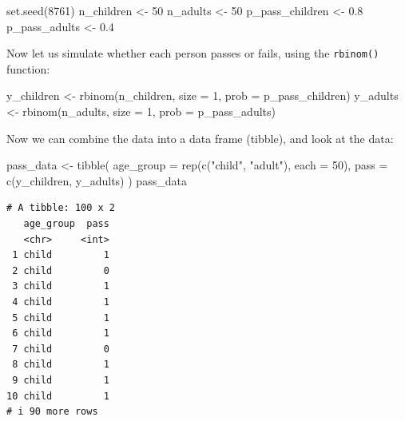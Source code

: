 \documentclass[
  letterpaper,
  8pt,
  a4paper]{book}
\newenvironment{Shaded}{\begin{snugshade}}{\end{snugshade}}
\newcommand{\AttributeTok}[1]{\textcolor[rgb]{0.40,0.45,0.13}{#1}}
\newcommand{\DecValTok}[1]{\textcolor[rgb]{0.68,0.00,0.00}{#1}}
\newcommand{\FloatTok}[1]{\textcolor[rgb]{0.68,0.00,0.00}{#1}}
\newcommand{\FunctionTok}[1]{\textcolor[rgb]{0.28,0.35,0.67}{#1}}
\newcommand{\NormalTok}[1]{\textcolor[rgb]{0.00,0.23,0.31}{#1}}
\newcommand{\OtherTok}[1]{\textcolor[rgb]{0.00,0.23,0.31}{#1}}
\newcommand{\StringTok}[1]{\textcolor[rgb]{0.13,0.47,0.30}{#1}}
\begin{document}
\begin{Shaded}
\begin{Highlighting}[]
\FunctionTok{set.seed}\NormalTok{(}\DecValTok{8761}\NormalTok{)}
\NormalTok{n\_children }\OtherTok{\textless{}{-}} \DecValTok{50}
\NormalTok{n\_adults }\OtherTok{\textless{}{-}} \DecValTok{50}
\NormalTok{p\_pass\_children }\OtherTok{\textless{}{-}} \FloatTok{0.8}
\NormalTok{p\_pass\_adults }\OtherTok{\textless{}{-}} \FloatTok{0.4}
\end{Highlighting}
\end{Shaded}

Now let us simulate whether each person passes or fails, using the
\texttt{rbinom()} function:

\begin{Shaded}
\begin{Highlighting}[]
\NormalTok{y\_children }\OtherTok{\textless{}{-}} \FunctionTok{rbinom}\NormalTok{(n\_children, }\AttributeTok{size =} \DecValTok{1}\NormalTok{, }\AttributeTok{prob =}\NormalTok{ p\_pass\_children)}
\NormalTok{y\_adults }\OtherTok{\textless{}{-}} \FunctionTok{rbinom}\NormalTok{(n\_adults, }\AttributeTok{size =} \DecValTok{1}\NormalTok{, }\AttributeTok{prob =}\NormalTok{ p\_pass\_adults)}
\end{Highlighting}
\end{Shaded}

Now we can combine the data into a data frame (tibble), and look at the
data:

\begin{Shaded}
\begin{Highlighting}[]
\NormalTok{pass\_data }\OtherTok{\textless{}{-}} \FunctionTok{tibble}\NormalTok{(}
  \AttributeTok{age\_group =} \FunctionTok{rep}\NormalTok{(}\FunctionTok{c}\NormalTok{(}\StringTok{"child"}\NormalTok{, }\StringTok{"adult"}\NormalTok{), }\AttributeTok{each =} \DecValTok{50}\NormalTok{),}
  \AttributeTok{pass =} \FunctionTok{c}\NormalTok{(y\_children, y\_adults)}
\NormalTok{)}
\NormalTok{pass\_data}
\end{Highlighting}
\end{Shaded}

\begin{verbatim}
# A tibble: 100 x 2
   age_group  pass
   <chr>     <int>
 1 child         1
 2 child         0
 3 child         1
 4 child         1
 5 child         1
 6 child         1
 7 child         0
 8 child         1
 9 child         1
10 child         1
# i 90 more rows
\end{verbatim}
\end{document}
